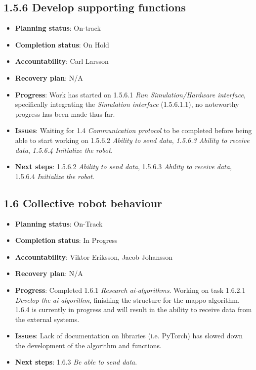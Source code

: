 
\subsection*{1.5.6 Develop supporting functions}
\begin{itemize}
    \item \textbf{Planning status}: On-track
    \item \textbf{Completion status}: On Hold
    \item \textbf{Accountability}: Carl Larsson
    \item \textbf{Recovery plan}: N/A
    \item \textbf{Progress}: Work has started on 1.5.6.1 \textit{Run Simulation/Hardware interface}, specifically integrating the \textit{Simulation interface} (1.5.6.1.1), no noteworthy progress has been made thus far.
    \item \textbf{Issues}: Waiting for 1.4 \textit{Communication protocol} to be completed before being able to start working on 1.5.6.2 \textit{Ability to send data}, \textit{1.5.6.3 Ability to receive data}, \textit{1.5.6.4 Initialize the robot}.
    \item \textbf{Next steps}: 1.5.6.2 \textit{Ability to send data}, 1.5.6.3 \textit{Ability to receive data}, 1.5.6.4 \textit{Initialize the robot}.
\end{itemize}


\subsection*{1.6 Collective robot behaviour}
\begin{itemize}
    \item \textbf{Planning status}: On-Track
    \item \textbf{Completion status}: In Progress
    \item \textbf{Accountability}: Viktor Eriksson, Jacob Johansson
    \item \textbf{Recovery plan}: N/A
    \item \textbf{Progress}: Completed 1.6.1 \textit{Research \acs{ai}-algorithms}. Working on task 1.6.2.1 \textit{Develop the \acs{ai}-algorithm}, finishing the structure for the \ac{mappo} algorithm. 1.6.4 is currently in progress and will result in the ability to receive data from the external systems.
    \item \textbf{Issues}: Lack of documentation on libraries (i.e. PyTorch) has slowed down the development of the algorithm and functions.
    \item \textbf{Next steps}: 1.6.3 \textit{Be able to send data}.
\end{itemize}

